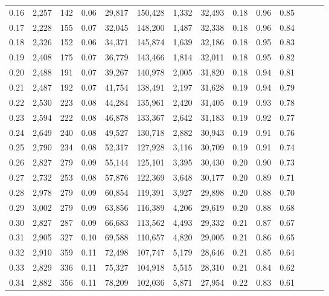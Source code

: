 \begin{tabular}{rrrrrrrrrrrrrr}
0.16 &  2,257 &    142 &  0.06 &   29,817 &  150,428 &   1,332 &  32,493 &  0.18 &  0.96 &      0.85 \\
0.17 &  2,228 &    155 &  0.07 &   32,045 &  148,200 &   1,487 &  32,338 &  0.18 &  0.96 &      0.84 \\
0.18 &  2,326 &    152 &  0.06 &   34,371 &  145,874 &   1,639 &  32,186 &  0.18 &  0.95 &      0.83 \\
0.19 &  2,408 &    175 &  0.07 &   36,779 &  143,466 &   1,814 &  32,011 &  0.18 &  0.95 &      0.82 \\
0.20 &  2,488 &    191 &  0.07 &   39,267 &  140,978 &   2,005 &  31,820 &  0.18 &  0.94 &      0.81 \\
0.21 &  2,487 &    192 &  0.07 &   41,754 &  138,491 &   2,197 &  31,628 &  0.19 &  0.94 &      0.79 \\
0.22 &  2,530 &    223 &  0.08 &   44,284 &  135,961 &   2,420 &  31,405 &  0.19 &  0.93 &      0.78 \\
0.23 &  2,594 &    222 &  0.08 &   46,878 &  133,367 &   2,642 &  31,183 &  0.19 &  0.92 &      0.77 \\
0.24 &  2,649 &    240 &  0.08 &   49,527 &  130,718 &   2,882 &  30,943 &  0.19 &  0.91 &      0.76 \\
0.25 &  2,790 &    234 &  0.08 &   52,317 &  127,928 &   3,116 &  30,709 &  0.19 &  0.91 &      0.74 \\
0.26 &  2,827 &    279 &  0.09 &   55,144 &  125,101 &   3,395 &  30,430 &  0.20 &  0.90 &      0.73 \\
0.27 &  2,732 &    253 &  0.08 &   57,876 &  122,369 &   3,648 &  30,177 &  0.20 &  0.89 &      0.71 \\
0.28 &  2,978 &    279 &  0.09 &   60,854 &  119,391 &   3,927 &  29,898 &  0.20 &  0.88 &      0.70 \\
0.29 &  3,002 &    279 &  0.09 &   63,856 &  116,389 &   4,206 &  29,619 &  0.20 &  0.88 &      0.68 \\
0.30 &  2,827 &    287 &  0.09 &   66,683 &  113,562 &   4,493 &  29,332 &  0.21 &  0.87 &      0.67 \\
0.31 &  2,905 &    327 &  0.10 &   69,588 &  110,657 &   4,820 &  29,005 &  0.21 &  0.86 &      0.65 \\
0.32 &  2,910 &    359 &  0.11 &   72,498 &  107,747 &   5,179 &  28,646 &  0.21 &  0.85 &      0.64 \\
0.33 &  2,829 &    336 &  0.11 &   75,327 &  104,918 &   5,515 &  28,310 &  0.21 &  0.84 &      0.62 \\
0.34 &  2,882 &    356 &  0.11 &   78,209 &  102,036 &   5,871 &  27,954 &  0.22 &  0.83 &      0.61 \\

\end{tabular}
